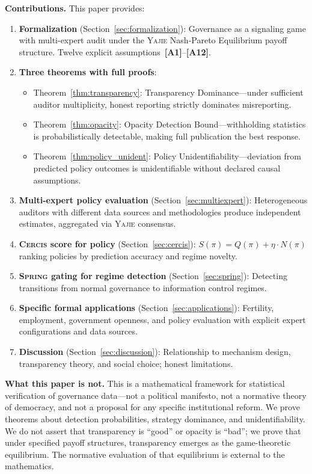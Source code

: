 \documentclass[11pt,a4paper]{article}
\theoremstyle{definition}
\newcommand{\Yajie}{\textsc{Yajie}}
\newcommand{\Spring}{\textsc{Spring}}
\newcommand{\Cercis}{\textsc{Cercis}}
\newcommand{\assumptionTag}[1]{\textsf{\textbf{[A#1]}}}
\begin{document}
\textbf{Contributions.} This paper provides:
\begin{enumerate}[label=(\roman*)]
    \item \textbf{Formalization} (Section~\ref{sec:formalization}): Governance as a signaling game with multi-expert audit under the \Yajie{} Nash-Pareto Equilibrium payoff structure. Twelve explicit assumptions~\assumptionTag{1}--\assumptionTag{12}.
    \item \textbf{Three theorems with full proofs}:
    \begin{itemize}
        \item Theorem~\ref{thm:transparency}: Transparency Dominance---under sufficient auditor multiplicity, honest reporting strictly dominates misreporting.
        \item Theorem~\ref{thm:opacity}: Opacity Detection Bound---withholding statistics is probabilistically detectable, making full publication the best response.
        \item Theorem~\ref{thm:policy_unident}: Policy Unidentifiability---deviation from predicted policy outcomes is unidentifiable without declared causal assumptions.
    \end{itemize}
    \item \textbf{Multi-expert policy evaluation} (Section~\ref{sec:multiexpert}): Heterogeneous auditors with different data sources and methodologies produce independent estimates, aggregated via \Yajie{} consensus.
    \item \textbf{\Cercis{} score for policy} (Section~\ref{sec:cercis}): $S(\pi) = Q(\pi) + \eta \cdot N(\pi)$ ranking policies by prediction accuracy and regime novelty.
    \item \textbf{\Spring{} gating for regime detection} (Section~\ref{sec:spring}): Detecting transitions from normal governance to information control regimes.
    \item \textbf{Specific formal applications} (Section~\ref{sec:applications}): Fertility, employment, government openness, and policy evaluation with explicit expert configurations and data sources.
    \item \textbf{Discussion} (Section~\ref{sec:discussion}): Relationship to mechanism design, transparency theory, and social choice; honest limitations.
\end{enumerate}
\textbf{What this paper is not.} This is a mathematical framework for statistical verification of governance data---not a political manifesto, not a normative theory of democracy, and not a proposal for any specific institutional reform. We prove theorems about detection probabilities, strategy dominance, and unidentifiability. We do not assert that transparency is ``good'' or opacity is ``bad''; we prove that under specified payoff structures, transparency emerges as the game-theoretic equilibrium. The normative evaluation of that equilibrium is external to the mathematics.
\end{document}
